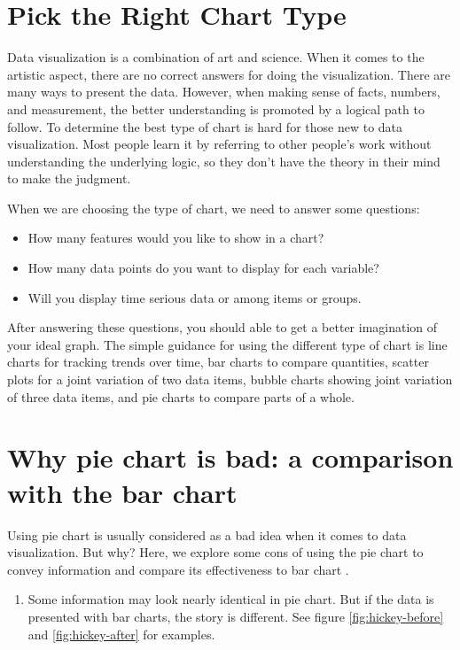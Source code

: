 \documentclass[]{book}
\providecommand{\tightlist}{%
  \setlength{\itemsep}{0pt}\setlength{\parskip}{0pt}}
\theoremstyle{definition}
\theoremstyle{definition}
\theoremstyle{definition}
\theoremstyle{remark}
\begin{document}
\section{Pick the Right Chart Type}\label{pick-the-right-chart-type}

Data visualization is a combination of art and science. When it comes to
the artistic aspect, there are no correct answers for doing the
visualization. There are many ways to present the data. However, when
making sense of facts, numbers, and measurement, the better
understanding is promoted by a logical path to follow. To determine the
best type of chart is hard for those new to data visualization. Most
people learn it by referring to other people's work without
understanding the underlying logic, so they don't have the theory in
their mind to make the judgment.

When we are choosing the type of chart, we need to answer some
questions:

\begin{itemize}
\tightlist
\item
  How many features would you like to show in a chart?
\item
  How many data points do you want to display for each variable?
\item
  Will you display time serious data or among items or groups.
\end{itemize}

After answering these questions, you should able to get a better
imagination of your ideal graph. The simple guidance for using the
different type of chart is line charts for tracking trends over time,
bar charts to compare quantities, scatter plots for a joint variation of
two data items, bubble charts showing joint variation of three data
items, and pie charts to compare parts of a whole.

\section{Why pie chart is bad: a comparison with the bar
chart}\label{why-pie-chart-is-bad-a-comparison-with-the-bar-chart}

Using pie chart is usually considered as a bad idea when it comes to
data visualization. But why? Here, we explore some cons of using the pie
chart to convey information and compare its effectiveness to bar chart
\citep{hickey-pie-worst} \citep{henry-defense-pie} \citep{quach-penny}.

\begin{enumerate}
\def\labelenumi{\arabic{enumi}.}
\tightlist
\item
  Some information may look nearly identical in pie chart. But if the
  data is presented with bar charts, the story is different. See figure
  \ref{fig:hickey-before} and \ref{fig:hickey-after} for examples.
\end{enumerate}
\end{document}
